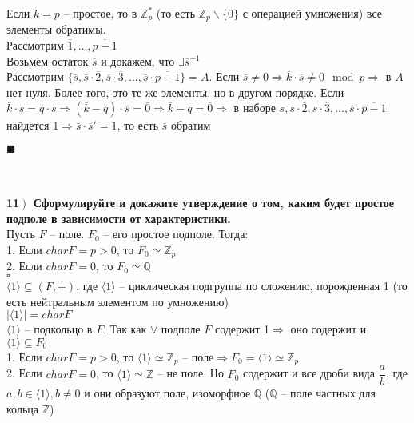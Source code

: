 \documentclass[a4paper,12pt]{article}
\begin{document}
Если $k=p$ -- простое, то в $\mathbb{Z}_p^*$ (то есть $\mathbb{Z}_p\backslash\{0\}$ с операцией умножения) все элементы обратимы.\\
Рассмотрим $\overline1, \ldots, \overline{p-1}$\\
Возьмем остаток $\overline s$ и докажем, что $\exists\overline s^{-1}$\\
Рассмотрим $\{\overline s, \overline s\cdot\overline2, \overline s\cdot\overline3, \ldots, \overline s\cdot\overline{p-1} \}=A$. Если $\overline s\ne 0\Rightarrow\overline k\cdot\overline s\ne0\mod p\Rightarrow$ в $A$ нет нуля. Более того, это те же элементы, но в другом порядке. Если $\overline k\cdot\overline s=\overline q\cdot\overline s\Rightarrow(\overline k-\overline q)\cdot\overline s=\overline0\Rightarrow\overline k-\overline q=\overline0\Rightarrow$ в наборе $\overline s, \overline s\cdot\overline 2, \overline s\cdot\overline 3, \ldots, \overline s\cdot\overline{p-1}$ найдется 1$\Rightarrow \overline s\cdot\overline s'=1$, то есть $\overline s$ обратим
\begin{flushright}
	$\blacksquare$
\end{flushright}
\textbf{}\\ \\
\textbf{11$\left.\right)$ Сформулируйте и докажите утверждение о том, каким будет простое подполе в зависимости от характеристики.}\\Пусть $F$ -- поле. $F_0$ -- его простое подполе. Тогда:\\
1. Если $char F=p>0$, то $F_0\simeq \mathbb{Z}_p$\\
2. Если $char F=0$, то $F_0\simeq\mathbb{Q}$\\
$\square$\\
$\langle 1\rangle\subseteq(F, +)$, где $\langle 1\rangle$ -- циклическая подгруппа по сложению, порожденная 1 (то есть нейтральным элементом по умножению)\\
$|\langle 1\rangle|=char F$\\
$\langle 1\rangle$ -- подкольцо в $F$. Так как $\forall$ подполе $F$ содержит 1$\Rightarrow$ оно содержит и $\langle 1\rangle\subseteq F_0$\\
1. Если $char F=p>0$, то $\langle 1\rangle\simeq\mathbb{Z}_p$ -- поле$\Rightarrow F_0=\langle 1\rangle\simeq\mathbb{Z}_p$\\
2. Если $char F=0$, то $\langle 1\rangle\simeq\mathbb{Z}$ -- не поле. Но $F_0$ содержит и все дроби вида $\dfrac{a}{b}$, где $a, b\in \langle 1\rangle, b\ne0$ и они образуют поле, изоморфное $\mathbb{Q}$ ($\mathbb{Q}$ -- поле частных для кольца $\mathbb{Z}$)
\end{document}
